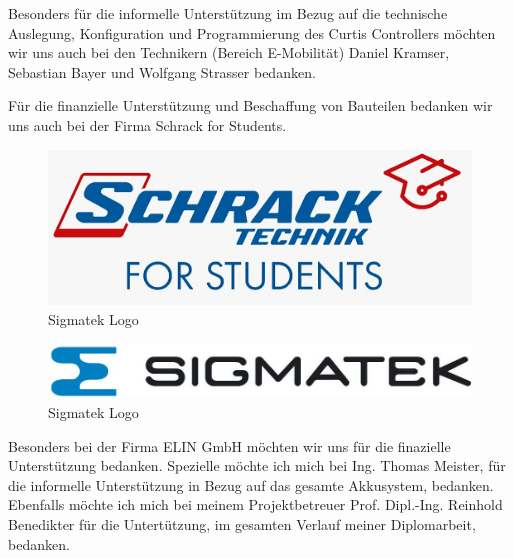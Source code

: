 Besonders für die informelle Unterstützung im Bezug auf die technische Auslegung, Konfiguration und Programmierung des Curtis Controllers möchten wir uns auch bei den Technikern (Bereich E-Mobilität) Daniel Kramser, Sebastian Bayer und Wolfgang Strasser bedanken.

Für die finanzielle Unterstützung und Beschaffung von Bauteilen bedanken wir uns auch bei der Firma Schrack for Students.

\begin{figure}[H]
	\begin{center}
		\includegraphics[scale=0.5]{figures/allgemein/Schrack_Logo.jpg}
		\caption{Sigmatek Logo}
	\end{center}
\end{figure}

\begin{figure}[H]
	\begin{center}
		\includegraphics[scale=0.5]{figures/allgemein/Sigmatek_LOGO.jpg}
		\caption{Sigmatek Logo}
	\end{center}
\end{figure}

\vspace{1cm}

Besonders bei der Firma ELIN GmbH möchten wir uns für die finazielle Unterstützung bedanken. Spezielle möchte ich mich bei Ing. Thomas Meister, für die informelle Unterstützung in Bezug auf das gesamte Akkusystem, bedanken.
Ebenfalls möchte ich mich bei meinem Projektbetreuer Prof. Dipl.-Ing. Reinhold Benedikter für die Untertützung, im gesamten Verlauf meiner Diplomarbeit, bedanken.

